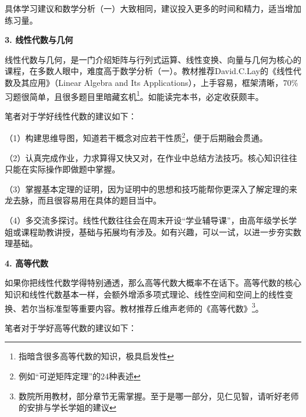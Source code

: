 \documentclass[11pt,oneside]{book}
\begin{document}
\vspace{10pt}

具体学习建议和数学分析（一）大致相同，建议投入更多的时间和精力，适当增加练习量。

\vspace{10pt}

\textbf{3. 线性代数与几何} 

线性代数与几何，是一门介绍矩阵与行列式运算、线性变换、向量与几何为核心的课程，在多数人眼中，难度高于数学分析（一）。教材推荐David.C.Lay的《线性代数及其应用》（Linear Algebra and Its Applications），上手容易，框架清晰，70\%习题很简单，且很多题目里暗藏玄机\footnote{指暗含很多高等代数的知识，极具启发性}。如能读完本书，必定收获颇丰。

\vspace{10pt}

笔者对于学好线性代数的建议如下：

\vspace{10pt}

（1）构建思维导图，知道若干概念对应若干性质\footnote{例如“可逆矩阵定理”的24种表述}，便于后期融会贯通。

\vspace{10pt}

（2）认真完成作业，力求算得又快又对，在作业中总结方法技巧。核心知识往往只能在实际操作即做题中掌握。

\vspace{10pt}

（3）掌握基本定理的证明，因为证明中的思想和技巧能帮你更深入了解定理的来龙去脉，而且很容易用在具体的题目当中。

\vspace{10pt}

（4）多交流多探讨。线性代数往往会在周末开设“学业辅导课”，由高年级学长学姐或课程助教讲授，基础与拓展均有涉及。如有兴趣，可以一试，以进一步夯实数理基础。

\vspace{10pt}

\textbf{4. 高等代数}

如果你把线性代数学得特别通透，那么高等代数大概率不在话下。高等代数的核心知识和线性代数基本一样，会额外增添多项式理论、线性空间和空间上的线性变换、若尔当标准型等重要内容。教材推荐丘维声老师的《高等代数》\footnote{数院所用教材，部分章节无需掌握。至于是哪一部分，见仁见智，请听好老师的安排与学长学姐的建议}。

\vspace{10pt}

笔者对于学好高等代数的建议如下：
\end{document}
